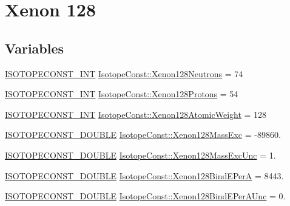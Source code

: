 \hypertarget{group___isotope_const-_xenon-_xe128}{}\section{Xenon 128}
\label{group___isotope_const-_xenon-_xe128}
\subsection*{Variables}
\begin{DoxyCompactItemize}
\item 
\mbox{\hyperlink{group___isotope_const-_macros_ga5f18360b3e99483a35c32d789e62621c}{I\+S\+O\+T\+O\+P\+E\+C\+O\+N\+S\+T\+\_\+\+I\+NT}} \mbox{\hyperlink{group___isotope_const-_xenon-_xe128_ga51f56c114e9dd19c054579d3ec489ee0}{Isotope\+Const\+::\+Xenon128\+Neutrons}} = 74
\item 
\mbox{\hyperlink{group___isotope_const-_macros_ga5f18360b3e99483a35c32d789e62621c}{I\+S\+O\+T\+O\+P\+E\+C\+O\+N\+S\+T\+\_\+\+I\+NT}} \mbox{\hyperlink{group___isotope_const-_xenon-_xe128_gad4f48dca0818da8b5f1e5d842a1f52cc}{Isotope\+Const\+::\+Xenon128\+Protons}} = 54
\item 
\mbox{\hyperlink{group___isotope_const-_macros_ga5f18360b3e99483a35c32d789e62621c}{I\+S\+O\+T\+O\+P\+E\+C\+O\+N\+S\+T\+\_\+\+I\+NT}} \mbox{\hyperlink{group___isotope_const-_xenon-_xe128_ga8f53618679307e24c7c71cb7f596b9c2}{Isotope\+Const\+::\+Xenon128\+Atomic\+Weight}} = 128
\item 
\mbox{\hyperlink{group___isotope_const-_macros_ga8f45a7272ce02c0b4c65c44636ed719a}{I\+S\+O\+T\+O\+P\+E\+C\+O\+N\+S\+T\+\_\+\+D\+O\+U\+B\+LE}} \mbox{\hyperlink{group___isotope_const-_xenon-_xe128_gacfa2da2bebcbfe3b46b44493c6855540}{Isotope\+Const\+::\+Xenon128\+Mass\+Exc}} = -\/89860.
\item 
\mbox{\hyperlink{group___isotope_const-_macros_ga8f45a7272ce02c0b4c65c44636ed719a}{I\+S\+O\+T\+O\+P\+E\+C\+O\+N\+S\+T\+\_\+\+D\+O\+U\+B\+LE}} \mbox{\hyperlink{group___isotope_const-_xenon-_xe128_gafccb28e50906b3a06345f07f8faeb5b0}{Isotope\+Const\+::\+Xenon128\+Mass\+Exc\+Unc}} = 1.
\item 
\mbox{\hyperlink{group___isotope_const-_macros_ga8f45a7272ce02c0b4c65c44636ed719a}{I\+S\+O\+T\+O\+P\+E\+C\+O\+N\+S\+T\+\_\+\+D\+O\+U\+B\+LE}} \mbox{\hyperlink{group___isotope_const-_xenon-_xe128_ga51ef18d422ada2c87b481d586a97e523}{Isotope\+Const\+::\+Xenon128\+Bind\+E\+PerA}} = 8443.
\item 
\mbox{\hyperlink{group___isotope_const-_macros_ga8f45a7272ce02c0b4c65c44636ed719a}{I\+S\+O\+T\+O\+P\+E\+C\+O\+N\+S\+T\+\_\+\+D\+O\+U\+B\+LE}} \mbox{\hyperlink{group___isotope_const-_xenon-_xe128_gad0cec2fb18bb4edf586cf5a529f4f18a}{Isotope\+Const\+::\+Xenon128\+Bind\+E\+Per\+A\+Unc}} = 0.

\end{DoxyCompactItemize}

